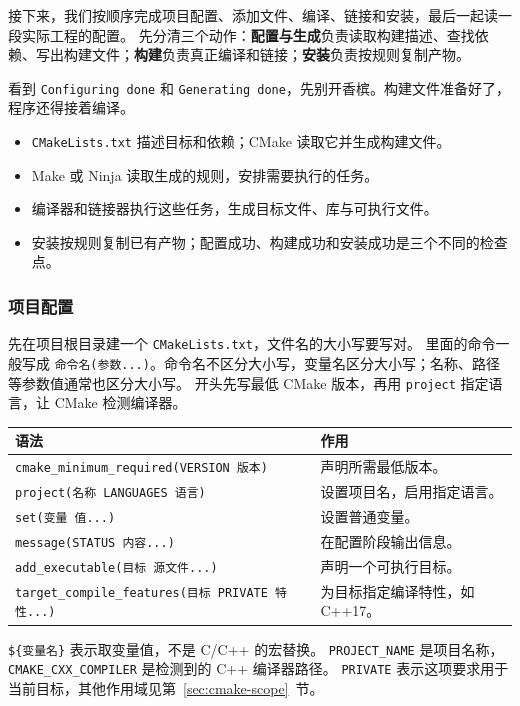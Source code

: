 接下来，我们按顺序完成项目配置、添加文件、编译、链接和安装，最后一起读一段实际工程的配置。
先分清三个动作：\textbf{配置与生成}负责读取构建描述、查找依赖、写出构建文件；\textbf{构建}负责真正编译和链接；\textbf{安装}负责按规则复制产物。

看到 \texttt{Configuring done} 和 \texttt{Generating done}，先别开香槟。构建文件准备好了，程序还得接着编译。

\begin{conclusion}
\begin{itemize}
    \item \texttt{CMakeLists.txt} 描述目标和依赖；CMake 读取它并生成构建文件。
    \item Make 或 Ninja 读取生成的规则，安排需要执行的任务。
    \item 编译器和链接器执行这些任务，生成目标文件、库与可执行文件。
    \item 安装按规则复制已有产物；配置成功、构建成功和安装成功是三个不同的检查点。
\end{itemize}
\end{conclusion}

\subsubsection{项目配置}
\label{sec:cmake-config}

先在项目根目录建一个 \texttt{CMakeLists.txt}，文件名的大小写要写对。
里面的命令一般写成 \texttt{命令名(参数...)}。命令名不区分大小写，变量名区分大小写；名称、路径等参数值通常也区分大小写。
开头先写最低 CMake 版本，再用 \texttt{project} 指定语言，让 CMake 检测编译器。

\begin{center}
\begin{tabular}{p{}p{}}
\toprule[1.5pt]
语法 & 作用 \\
\midrule[1pt]
\texttt{cmake\_minimum\_required(VERSION 版本)} & 声明所需最低版本。\\
\texttt{project(名称 LANGUAGES 语言)} & 设置项目名，启用指定语言。\\
\texttt{set(变量 值...)} & 设置普通变量。\\
\texttt{message(STATUS 内容...)} & 在配置阶段输出信息。\\
\texttt{add\_executable(目标 源文件...)} & 声明一个可执行目标。\\
\texttt{target\_compile\_features(目标 PRIVATE 特性...)} & 为目标指定编译特性，如 C++17。\\
\bottomrule[1.5pt]
\end{tabular}
\end{center}
\texttt{\$\{变量名\}} 表示取变量值，不是 C/C++ 的宏替换。
\texttt{PROJECT\_NAME} 是项目名称，\texttt{CMAKE\_CXX\_COMPILER} 是检测到的 C++ 编译器路径。
\texttt{PRIVATE} 表示这项要求用于当前目标，其他作用域见第~\ref{sec:cmake-scope}~节。

